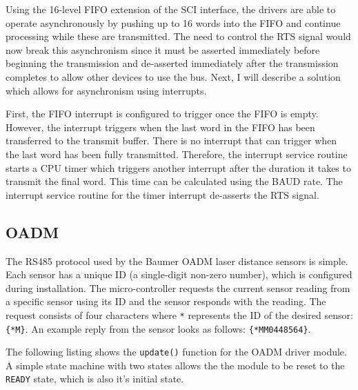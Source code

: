 Using the 16-level FIFO extension of the SCI interface, the drivers are able to operate asynchronously by pushing up to 16 words into the FIFO and continue processing while these are transmitted. The need to control the RTS signal would now break this asynchronism since it must be asserted immediately before beginning the transmission and de-asserted immediately after the transmission completes to allow other devices to use the bus. Next, I will describe a solution which allows for asynchronism using interrupts.

First, the FIFO interrupt is configured to trigger once the FIFO is empty. However, the interrupt triggers when the last word in the FIFO has been transferred to the transmit buffer. There is no interrupt that can trigger when the last word has been fully transmitted. Therefore, the interrupt service routine starts a CPU timer which triggers another interrupt after the duration it takes to transmit the final word. This time can be calculated using the BAUD rate. The interrupt service routine for the timer interrupt de-asserts the RTS signal.

\subsection{OADM}

The RS485 protocol used by the Baumer OADM laser distance sensors\cite{oadm} is simple. Each sensor has a unique ID (a single-digit non-zero number), which is configured during installation. The micro-controller requests the current sensor reading from a specific sensor using its ID and the sensor responds with the reading. The request consists of four characters where \texttt{*} represents the ID of the desired sensor: \texttt{\{*M\}}. An example reply from the sensor looks as follows: \texttt{\{*MM0448564\}}.

The following listing shows the \texttt{update()} function for the OADM driver module. A simple state machine with two states allows the the module to be reset to the \texttt{READY} state, which is also it's initial state.

